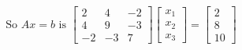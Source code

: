 \documentclass[preview]{standalone}
\begin{document}
\begin{align*}
\text{So } A x = b \text{ is } \begin{bmatrix} 2 & 4 & -2 \\ 4 & 9 & -3 \\ -2 & -3 & 7 \end{bmatrix}\begin{bmatrix} x_1 \\ x_2 \\ x_3\end{bmatrix} = \begin{bmatrix} 2 \\ 8 \\ 10 \end{bmatrix}
\end{align*}
\end{document}
